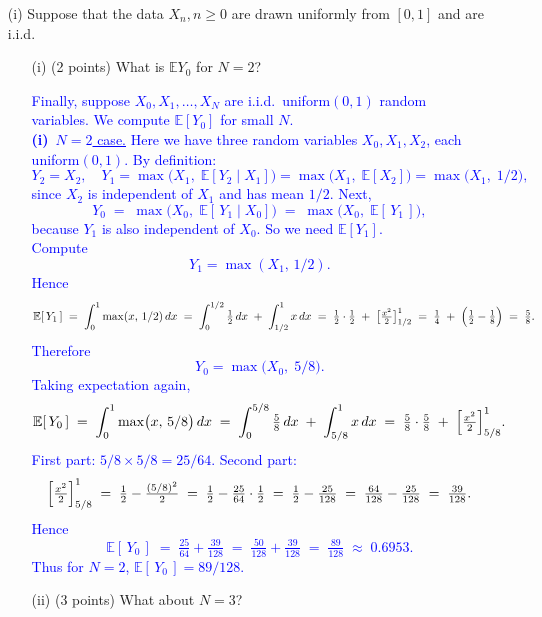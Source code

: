 \documentclass{article}
\begin{document}
\begin{enumerate}
    \item[(i)] Suppose that the data $X_n, n \geq 0$ are drawn uniformly from $[0, 1]$ and are i.i.d.
    \begin{enumerate}
        \item[(i)] (2 points) What is $\mathbb{E}Y_0$ for $N = 2$?

        \textcolor{blue}{
            Finally, suppose $X_0, X_1, \ldots, X_N$ are i.i.d.\ uniform$(0,1)$ random variables. We compute $\mathbb{E}[Y_0]$ for small $N$. \\
\medskip
\noindent
\textbf{(i)}~\underline{$N=2$ case.} 
Here we have three random variables $X_0, X_1, X_2$, each uniform$(0,1)$. By definition:
\[
Y_2 = X_2,
\quad
Y_1 = \max\bigl(X_1,\; \mathbb{E}[Y_2 \mid X_1]\bigr)
     = \max\bigl(X_1,\; \mathbb{E}[X_2]\bigr)
     = \max\bigl(X_1,\; 1/2\bigr),
\]
since $X_2$ is independent of $X_1$ and has mean $1/2$. Next,
\[
Y_0 
\;=\; 
\max\bigl(X_0,\; \mathbb{E}[\,Y_1 \mid X_0]\bigr)
\;=\;
\max\bigl(X_0,\; \mathbb{E}[\,Y_1\,]\bigr),
\]
because $Y_1$ is also independent of $X_0$. So we need $\mathbb{E}[Y_1]$.  \\
Compute 
\[
Y_1 = \max(X_1,\,1/2).
\]
Hence
\[
\mathbb{E}[\,Y_1\,]
\;=\;
\int_0^1 \max(x,\,1/2)\,dx
\;=\;
\int_{0}^{1/2} \tfrac12\,dx \;+\;\int_{1/2}^{1} x\,dx
\;=\;
\tfrac12 \cdot \tfrac12 \;+\;\bigl[\tfrac{x^2}{2}\bigr]_{1/2}^1
\;=\;
\tfrac{1}{4} \;+\;\Bigl(\tfrac12 - \tfrac{1}{8}\Bigr)
\;=\;
\tfrac{5}{8}.
\]
Therefore
\[
Y_0 = \max\bigl(X_0,\; 5/8\bigr).
\]
Taking expectation again,
\[
\mathbb{E}[\,Y_0\,]
\;=\;
\int_0^1 \max\bigl(x,\,5/8\bigr)\,dx
\;=\;
\int_0^{5/8} \tfrac{5}{8}\,dx
\;+\;
\int_{5/8}^{1} x\,dx
\;=\;
\tfrac{5}{8}\cdot \tfrac{5}{8}
\;+\;
\Bigl[\tfrac{x^2}{2}\Bigr]_{5/8}^1.
\]
First part: $5/8 \times 5/8 = 25/64$. Second part:
\[
\Bigl[\tfrac{x^2}{2}\Bigr]_{5/8}^1
\;=\;
\tfrac12 - \tfrac{(5/8)^2}{2}
\;=\;
\tfrac12 - \tfrac{25}{64}\cdot\tfrac12
\;=\;
\tfrac12 - \tfrac{25}{128}
\;=\;
\tfrac{64}{128} - \tfrac{25}{128}
\;=\;
\tfrac{39}{128}.
\]
Hence
\[
\mathbb{E}[\,Y_0\,]
\;=\;
\tfrac{25}{64} + \tfrac{39}{128}
\;=\;
\tfrac{50}{128} + \tfrac{39}{128}
\;=\;
\tfrac{89}{128}
\;\approx\; 0.6953.
\]
Thus for $N=2$, $\mathbb{E}[\,Y_0\,] = 89/128$.
        }


        \item[(ii)] (3 points) What about $N = 3$?


\end{enumerate}
\end{enumerate}
\end{document}
